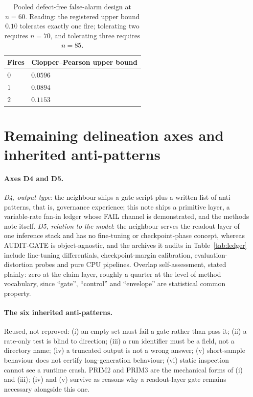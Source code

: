 \documentclass{article}
\begin{document}
\begin{table}[H]
\caption{Pooled defect-free false-alarm design at $n=60$. Reading: the registered upper
bound $0.10$ tolerates exactly one fire; tolerating two requires $n=70$, and tolerating three
requires $n=85$.}
\label{tab:cpfalsealarm}
\centering
\small
\setlength{\tabcolsep}{6pt}
\begin{tabular}{@{}L{270pt}L{100pt}@{}}
\toprule
Fires & Clopper--Pearson upper bound \\
\midrule
$0$ & $0.0596$ \\
$1$ & $0.0894$ \\
$2$ & $0.1153$ \\
\bottomrule
\end{tabular}
\end{table}

\section{Remaining delineation axes and inherited anti-patterns}
\label{app:delta}

\paragraph{Axes D4 and D5.}
\emph{D4, output type}: the neighbour ships a gate script plus a written list of
anti-patterns, that is, governance experience; this note ships a primitive layer, a
variable-rate fan-in ledger whose FAIL channel is demonstrated, and the methods note
itself. \emph{D5, relation to the model}: the neighbour serves the readout layer of one
inference stack and has no fine-tuning or checkpoint-phase concept, whereas AUDIT-GATE is
object-agnostic, and the archives it audits in Table~\ref{tab:ledger} include fine-tuning
differentials, checkpoint-margin calibration, evaluation-distortion probes and pure CPU
pipelines. Overlap self-assessment, stated plainly: zero at the claim layer, roughly a
quarter at the level of method vocabulary, since ``gate'', ``control'' and ``envelope''
are statistical common property.

\paragraph{The six inherited anti-patterns.}
Reused, not reproved: (i) an empty set must fail a gate rather than pass it; (ii) a
rate-only test is blind to direction; (iii) a run identifier must be a field, not a
directory name; (iv) a truncated output is not a wrong answer; (v) short-sample behaviour
does not certify long-generation behaviour; (vi) static inspection cannot see a runtime
crash. PRIM2 and PRIM3 are the mechanical forms of (i) and (iii); (iv) and (v) survive as
reasons why a readout-layer gate remains necessary alongside this one.
\end{document}
